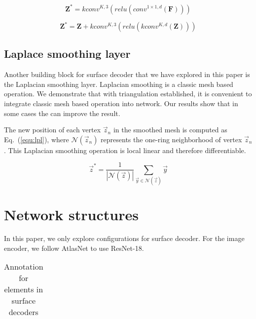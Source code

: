 \begin{equation}
\mathbf{Z^*} = kconv^{K,3}(relu(conv^{1 \times 1 ,d}(\mathbf{F})))
\end{equation}

\begin{equation}
\mathbf{Z^*} = \mathbf{Z} + kconv^{K,3}(relu(kconv^{K,d}(\mathbf{Z})))
\end{equation}

\subsection{Laplace smoothing layer}
Another building block for surface decoder that we have explored in this paper is the Laplacian smoothing layer. Laplacian smoothing is a classic mesh based operation. We demonstrate that with triangulation established, it is convenient to integrate classic mesh based operation into network. Our results show that in some cases the can improve the result.

The new position of each vertex $\vec{z}_n$ in the smoothed mesh is computed as Eq.~(\ref{equ:lpl}), where $\mathcal{N}(\vec{z}_n)$ represents the one-ring neighborhood of vertex $\vec{z}_n$. 
This Laplacian smoothing operation is local linear and therefore differentiable.

\begin{equation}
	\vec{z}^* = \frac{1}{|\mathcal{N}(\vec{z})|}\sum_{\vec{y}\in\mathcal{N}(\vec{z})}\vec{y}
	\label{equ:lpl}
\end{equation}

\section{Network structures}
In this paper, we only explore configurations for surface decoder. For the image encoder, we follow AtlasNet\cite{atlasnet} to use ResNet-18\cite{resnet}.

\begin{table}
	\caption{Annotation for elements in surface decoders}
	\label{tab:elemann}
	\centering
	\begin{tabular}{l | l | l | l | l}
	\end{tabular}	
\end{table}
